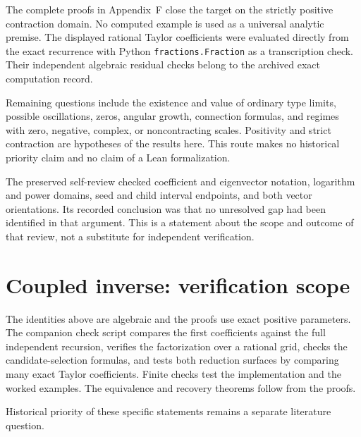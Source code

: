 The complete proofs in Appendix~F close the target on the strictly positive
contraction domain. No computed example is used as a universal analytic
premise. The displayed rational Taylor coefficients were evaluated
directly from the exact recurrence with Python
\texttt{fractions.Fraction} as a transcription check. Their independent
algebraic residual checks belong to the archived exact computation record.

Remaining questions include the existence and value of ordinary type
limits, possible oscillations, zeros, angular growth, connection
formulas, and regimes with zero, negative, complex, or noncontracting
scales. Positivity and strict contraction are hypotheses of the results
here. This route makes no historical priority claim and no claim of a
Lean formalization.

The preserved self-review checked coefficient and eigenvector notation,
logarithm and power domains, seed and child interval endpoints, and both
vector orientations. Its recorded conclusion was that no unresolved gap had
been identified in that argument. This is a statement about the scope and
outcome of that review, not a substitute for independent verification.


\hypertarget{v11-coupled_inverse_full-verification-scope}{%
\section*{Coupled inverse: verification scope}\label{v11-coupled_inverse_full-verification-scope}}

The identities above are algebraic and the proofs use exact positive
parameters. The companion check script compares the first coefficients
against the full independent recursion, verifies the factorization over
a rational grid, checks the candidate-selection formulas, and tests both
reduction surfaces by comparing many exact Taylor coefficients. Finite
checks test the implementation and the worked examples. The equivalence
and recovery theorems follow from the proofs.

Historical priority of these specific statements remains a separate
literature question.
